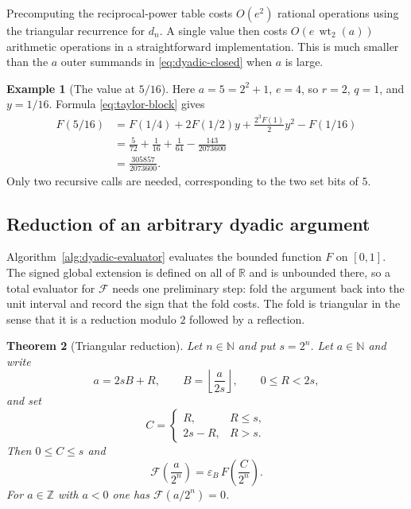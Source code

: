 \documentclass[11pt,oneside]{article}
\newtheorem{theorem}{Theorem}[section]
\theoremstyle{definition}
\newtheorem{example}[theorem]{Example}
\theoremstyle{remark}
\newcommand{\R}{\mathbb R}
\newcommand{\N}{\mathbb N}
\newcommand{\Z}{\mathbb Z}
\newcommand{\wt}{\operatorname{wt}_2}
\begin{document}
Precomputing the reciprocal-power table costs $O(e^2)$ rational operations using the
triangular recurrence for $d_n$.  A single value then costs
$O(e\,\wt(a))$ arithmetic operations in a straightforward implementation.  This is much
smaller than the $a$ outer summands in \eqref{eq:dyadic-closed} when $a$ is large.

\begin{example}[The value at $5/16$]
Here $a=5=2^2+1$, $e=4$, so $r=2$, $q=1$, and $y=1/16$.  Formula
\eqref{eq:taylor-block} gives
\begin{align*}
 F(5/16)
 &=F(1/4)+2F(1/2)y+\frac{2^3F(1)}{2}y^2-F(1/16)\\
 &=\frac5{72}+\frac1{16}+\frac1{64}-\frac{143}{2073600}\\
 &=\boxed{\frac{305857}{2073600}}.
\end{align*}
Only two recursive calls are needed, corresponding to the two set bits of $5$.
\end{example}


\subsection{Reduction of an arbitrary dyadic argument}
\label{subsec:dy-triangular}

Algorithm~\ref{alg:dyadic-evaluator} evaluates the bounded function $F$ on $[0,1]$.  The signed
global extension is defined on all of $\R$ and is unbounded there, so a total evaluator for
$\mathcal F$ needs one preliminary step: fold the argument back into the unit interval and
record the sign that the fold costs.  The fold is triangular in the sense that it is a
reduction modulo $2$ followed by a reflection.

\begin{theorem}[Triangular reduction]
\label{thm:dy-triangular}
Let $n\in\N$ and put $s=2^n$.  Let $a\in\N$ and write
\begin{equation}
 a=2sB+R,\qquad B=\left\lfloor\frac a{2s}\right\rfloor,\qquad 0\le R<2s,
                                                               \label{eq:dy-triangular-split}
\end{equation}
and set
\begin{equation}
 C=\begin{cases}R,&R\le s,\\ 2s-R,&R>s.\end{cases}
                                                               \label{eq:dy-triangular-fold}
\end{equation}
Then $0\le C\le s$ and
\begin{equation}
\boxed{\ \mathcal F\!\left(\frac a{2^n}\right)=\varepsilon_B\,F\!\left(\frac C{2^n}\right).\ }
                                                               \label{eq:dy-triangular}
\end{equation}
For $a\in\Z$ with $a<0$ one has $\mathcal F(a/2^n)=0$.
\end{theorem}
\end{document}
